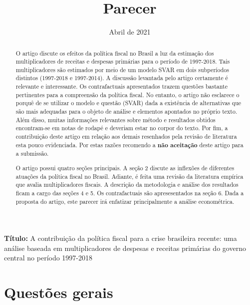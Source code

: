 \documentclass[11pt]{article}
\date{Abril de 2021}
\title{Parecer}
\begin{document}
\maketitle
\noindent \textbf{Título:} A contribuição da política fiscal para a crise brasileira recente: uma análise baseada em multiplicadores de despesas e receitas primárias do governo central no período 1997-2018

\begin{abstract}
O artigo discute os efeitos da política fiscal no Brasil a luz da estimação dos multiplicadores de receitas e despesas primárias para o período de 1997-2018.
Tais multiplicadores são estimados por meio de um modelo SVAR em dois subperíodos distintos (1997-2018 e 1997-2014).
A discussão levantada pelo artigo certamente é relevante e interessante.
Os contrafactuais apresentados trazem questões bastante pertinentes para a compreensão da política fiscal.
No entanto, o artigo não esclarece o porquê de se utilizar o modelo e questão (SVAR) dada a existência de alternativas que são mais adequadas para o objeto de análise e elementos apontados no próprio texto.
Além disso, muitas informações relevantes sobre método e resultados obtidos encontram-se em notas de rodapé e deveriam estar no corpor do texto.
Por fim, a contribuição deste artigo em relação aos demais resenhados pela revisão de literatura esta pouco evidenciada.
Por estas razões recomendo a \textbf{não aceitação} deste artigo para a submissão.

O artigo possui quatro seções principais.
A seção 2 discute as inflexões de diferentes atuações da política fiscal no Brasil.
Adiante, é feita uma revisão da literatura empírica que avalia multiplicadores fiscais.
A descrição da metodologia e análise dos resultados ficam a cargo das seções 4 e 5.
Os contrafactuais são apresesentados na seção 6.
Dada a proposta do artigo, este parecer irá enfatizar principalmente a análise econométrica.
\end{abstract}

\section{Questões gerais}
\label{sec:orgc2907e8}
\end{document}

